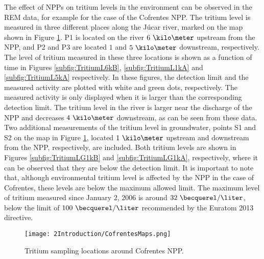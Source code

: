 The effect of NPPs on tritium levels in the environment can be observed in the REM data, for example for the case of the Cofrentes NPP. The tritium level is measured in three different places along the Júcar river, marked on the map shown in Figure \ref{fig:SamplingLocations}. P1 is located on the river $6~\kilo\meter$ upstream from the NPP, and P2 and P3 are located $1$ and $5~\kilo\meter$ downstream, respectively. The level of tritium measured in these three locations is shown as a function of time in Figures \ref{subfig:TritiumL6kB}, \ref{subfig:TritiumL1kA} and \ref{subfig:TritiumL5kA} respectively. In these figures, the detection limit and the measured activity are plotted with white and green dots, respectively. The measured activity is only displayed when it is larger than the corresponding detection limit. The tritium level in the river is larger near the discharge of the NPP and decreases $4~\kilo\meter$ downstream, as can be seen from these data. Two additional measurements of the tritium level in groundwater, points S1 and S2 on the map in Figure \ref{fig:SamplingLocations}, located $1~\kilo\meter$ upstream and downstream from the NPP, respectively, are included. Both tritium levels are shown in Figures \ref{subfig:TritiumLG1kB} and \ref{subfig:TritiumLG1kA}, respectively, where it can be observed that they are below the detection limit. It is important to note that, although environmental tritium level is affected by the NPP in the case of Cofrentes, these levels are below the maximum allowed limit. The maximum level of tritium measured since January 2, 2006 is around $32~\becquerel/\liter$, below the limit of $100~\becquerel/\liter$ recommended by the Euratom 2013 directive.

\begin{figure}[hbtp]
\texttt{[image: 2Introduction/CofrentesMaps.png]}
\centering
\caption{Tritium sampling locations around Cofrentes NPP.\label{fig:SamplingLocations}}
\end{figure}

